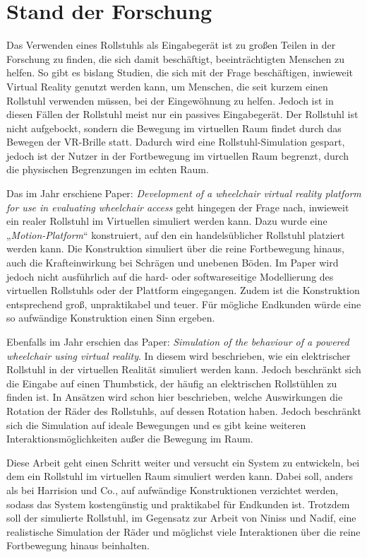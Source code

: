 \chapter{Stand der Forschung}
Das Verwenden eines Rollstuhls als Eingabegerät ist zu großen Teilen in der Forschung zu finden, die sich damit beschäftigt, beeinträchtigten Menschen zu helfen.
So gibt es bislang Studien, die sich mit der Frage beschäftigen, inwieweit Virtual Reality genutzt werden kann, um Menschen, die seit kurzem einen Rollstuhl verwenden müssen, bei der Eingewöhnung zu helfen\cite{arlatiVirtualRealitybasedWheelchair2020}.
Jedoch ist in diesen Fällen der Rollstuhl meist nur ein passives Eingabegerät.
Der Rollstuhl ist nicht aufgebockt, sondern die Bewegung im virtuellen Raum findet durch das Bewegen der VR-Brille statt.
Dadurch wird eine Rollstuhl-Simulation gespart, jedoch ist der Nutzer in der Fortbewegung im virtuellen Raum begrenzt, durch die physischen Begrenzungen im echten Raum.

Das im Jahr \citeyear{harrisionDevelopmentWheelchairVirtual2000} erschiene Paper: \textit{Development of a wheelchair virtual reality platform for use in evaluating wheelchair access} geht hingegen der Frage nach, inwieweit ein realer Rollstuhl im Virtuellen simuliert werden kann\cite{harrisionDevelopmentWheelchairVirtual2000}.
Dazu wurde eine „\textit{Motion-Platform}“ konstruiert, auf den ein handelsüblicher Rollstuhl platziert werden kann.
Die Konstruktion simuliert über die reine Fortbewegung hinaus, auch die Krafteinwirkung bei Schrägen und unebenen Böden.
Im Paper wird jedoch nicht ausführlich auf die hard- oder softwareseitige Modellierung des virtuellen Rollstuhls oder der Plattform eingegangen.
Zudem ist die Konstruktion entsprechend groß, unpraktikabel und teuer.
Für mögliche Endkunden würde eine so aufwändige Konstruktion einen Sinn ergeben.

Ebenfalls im Jahr \citeyear{ninissSimulationBehaviourPowered2000} erschien das Paper: \textit{Simulation of the behaviour of a powered wheelchair using virtual reality}\cite{ninissSimulationBehaviourPowered2000}.
In diesem wird beschrieben, wie ein elektrischer Rollstuhl in der virtuellen Realität simuliert werden kann.
Jedoch beschränkt sich die Eingabe auf einen Thumbstick, der häufig an elektrischen Rollstühlen zu finden ist.
In Ansätzen wird schon hier beschrieben, welche Auswirkungen die Rotation der Räder des Rollstuhls, auf dessen Rotation haben.
Jedoch beschränkt sich die Simulation auf ideale Bewegungen und es gibt keine weiteren Interaktionsmöglichkeiten außer die Bewegung im Raum.

Diese Arbeit geht einen Schritt weiter und versucht ein System zu entwickeln, bei dem ein Rollstuhl im virtuellen Raum simuliert werden kann.
Dabei soll, anders als bei Harrision und Co., auf aufwändige Konstruktionen verzichtet werden, sodass das System kostengünstig und praktikabel für Endkunden ist.
Trotzdem soll der simulierte Rollstuhl, im Gegensatz zur Arbeit von Niniss und Nadif, eine realistische Simulation der Räder und möglichst viele Interaktionen über die reine Fortbewegung hinaus beinhalten.